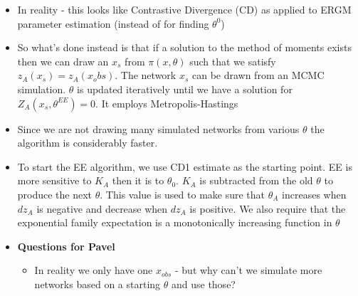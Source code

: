 \begin{itemize}
    \item In reality - this looks like Contrastive Divergence (CD) as applied to ERGM parameter estimation (instead of for finding $\theta^{0}$)
    \item So what's done instead is that if a solution to the method of moments exists then we can draw an $x_s$ from $\pi(x, \theta)$ such that we satisfy $z_{A}(x_s) = z_{A}(x_obs)$. The network $x_s$ can be drawn from an MCMC simulation. $\theta$ is updated iteratively until we have a solution for $Z_{A}(x_s, \theta^{EE}) = 0$. It employs Metropolis-Hastings
    \item Since we are not drawing many simulated networks from various $\theta$ the algorithm is considerably faster.
    \item To start the EE algorithm, we use CD1 estimate as the starting point. EE is more sensitive to $K_A$ then it is to $\theta_0$. $K_A$ is subtracted from the old $\theta$ to produce the next $\theta$. This value is used to make sure that $\theta_A$ increases when $dz_A$ is negative and decrease when $dz_A$ is positive. We also require that the exponential family expectation is a monotonically increasing function in $\theta$
    \item \textbf{Questions for Pavel}
    \begin{itemize}
        \item In reality we only have one $x_{obs}$ - but why can't we simulate more networks based on a starting $\theta$ and use those?
    \end{itemize}
\end{itemize}


